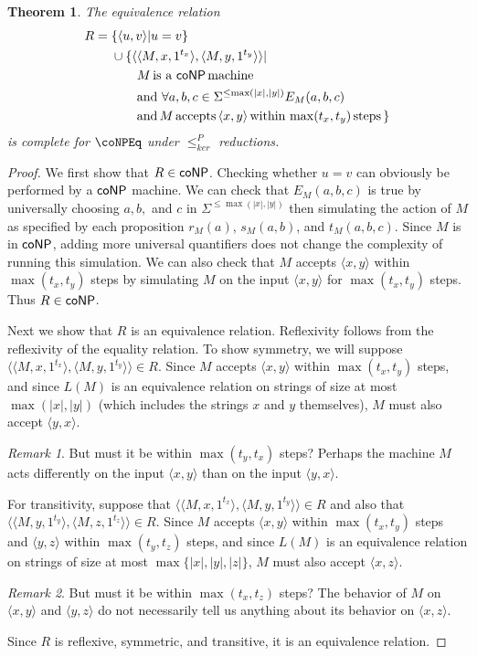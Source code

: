 \documentclass[draft]{article}
\newtheorem{theorem}{Theorem}[section]
\theoremstyle{definition} \newtheorem{openproblem}[openproblem]{Open problem}
\theoremstyle{definition} \newtheorem{definition}[definition]{Definition}
\theoremstyle{remark} \newtheorem{remark}{Remark}
\newcommand{\plain}[1]{\,\text{#1}\,} %
\newcommand{\kr}{\leq^{P}_{ker}} %
\newcommand{\pair}[2]{\langle#1,#2\rangle} %
\newcommand{\triple}[3]{\langle#1,#2,#3\rangle} %
\begin{document}
\begin{theorem}
  The equivalence relation
  \begin{align*}
    R = {} & \{\pair{u}{v}|u=v\} \\
    & \cup \{\pair{\triple{M}{x}{1^{t_x}}}{\triple{M}{y}{1^{t_y}}} | \\
    & \qquad M \plain{is a}\, \coNP \plain{machine} \\
    & \qquad \text{and}\,\, \forall a,b,c\in\Sigma^{\leq \max(|x|,|y|)} E_M(a, b, c) \\
    & \qquad \text{and}\, M \plain{accepts} \pair{x}{y} \plain{within} \max(t_x, t_y) \plain{steps}\}
  \end{align*}
  is complete for $\coNPEq$ under $\kr$ reductions.
\end{theorem}
\begin{proof}
  We first show that $R\in{\ensuremath{\mathsf{coNP}}}$.
  Checking whether $u=v$ can obviously be performed by a ${\mathsf{coNP}}$ machine.
  We can check that $E_M(a, b, c)$ is true by universally choosing $a,b,$ and $c$ in $\Sigma^{\leq \max(|x|, |y|)}$ then simulating the action of $M$ as specified by each proposition $r_M(a)$, $s_M(a, b)$, and $t_M(a, b, c)$.
  Since $M$ is in ${\mathsf{coNP}}$, adding more universal quantifiers does not change the complexity of running this simulation.
  We can also check that $M$ accepts $\pair{x}{y}$ within $\max(t_x, t_y)$ steps by simulating $M$ on the input $\pair{x}{y}$ for $\max(t_x, t_y)$ steps.
  Thus $R\in{\ensuremath{\mathsf{coNP}}}$.

  Next we show that $R$ is an equivalence relation.
  Reflexivity follows from the reflexivity of the equality relation.
  To show symmetry, we will suppose $\pair{\triple{M}{x}{1^{t_x}}}{\triple{M}{y}{1^{t_y}}}\in R$.
  Since $M$ accepts $\pair{x}{y}$ within $\max(t_x, t_y)$ steps, and since $L(M)$ is an equivalence relation on strings of size at most $\max(|x|, |y|)$ (which includes the strings $x$ and $y$ themselves), $M$ must also accept $\pair{y}{x}$.
  \begin{remark}
    But must it be within $\max(t_y, t_x)$ steps?
    Perhaps the machine $M$ acts differently on the input $\pair{x}{y}$ than on the input $\pair{y}{x}$.
  \end{remark}
  For transitivity, suppose that $\pair{\triple{M}{x}{1^{t_x}}}{\triple{M}{y}{1^{t_y}}}\in R$ and also that $\pair{\triple{M}{y}{1^{t_y}}}{\triple{M}{z}{1^{t_z}}}\in R$.
  Since $M$ accepts $\pair{x}{y}$ within $\max(t_x, t_y)$ steps and $\pair{y}{z}$ within $\max(t_y, t_z)$ steps, and since $L(M)$ is an equivalence relation on strings of size at most $\max\{|x|, |y|, |z|\}$, $M$ must also accept $\pair{x}{z}$.
  \begin{remark}
    But must it be within $\max(t_x, t_z)$ steps?
    The behavior of $M$ on $\pair{x}{y}$ and $\pair{y}{z}$ do not necessarily tell us anything about its behavior on $\pair{x}{z}$.
  \end{remark}
  Since $R$ is reflexive, symmetric, and transitive, it is an equivalence relation.


\end{proof}
\end{document}
